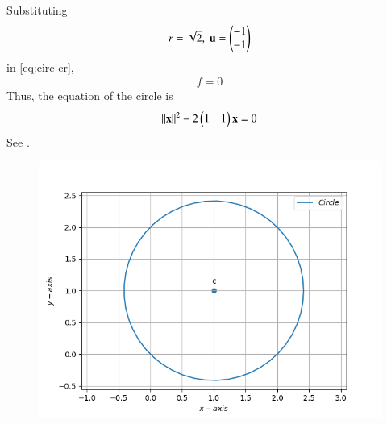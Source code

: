 Substituting
\begin{align}
	 r = \sqrt{2},\
	\mathbf{u}
	 = \begin{pmatrix}-1\\-1\end{pmatrix}
\end{align}
in 
	\eqref{eq:circ-cr},
\begin{align}
	f 
	  =0	
\end{align}
Thus, the equation of the circle is 
\begin{align}
	\left\lVert\mathbf{x}\right\rVert^2 -2\begin{pmatrix}1&1\end{pmatrix}\mathbf{x} = 0       		       
\end{align}	
See 
.
\begin{figure}[!ht]
	\begin{center} 
	  \includegraphics[width=\columnwidth]{chapters/11/11/1/4/figs/circ.png}
	\end{center}
\caption{}
\label{fig:chapters/11/11/1/4/Fig1}
\end{figure}
